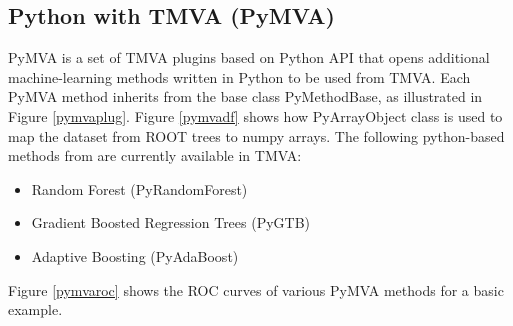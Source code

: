 \documentclass[a4paper]{jpconf}
\begin{document}
\subsection{Python with TMVA (PyMVA)} \label{PYMVA}
PyMVA is a set of TMVA plugins based on Python API that opens additional machine-learning methods written in Python to be used from TMVA. Each PyMVA method inherits from the base class PyMethodBase, as illustrated in Figure \ref{pymvaplug}. Figure \ref{pymvadf} shows how PyArrayObject class is used to map the dataset from ROOT trees to numpy arrays. The following python-based methods from \cite{pedregosa2011scikit} are currently available in TMVA:


\begin{itemize}
\item Random Forest (PyRandomForest)
\item Gradient Boosted Regression Trees (PyGTB) 
\item Adaptive Boosting (PyAdaBoost) 
\end{itemize}
Figure \ref{pymvaroc} shows the ROC curves of various PyMVA methods for a basic example.
\end{document}
